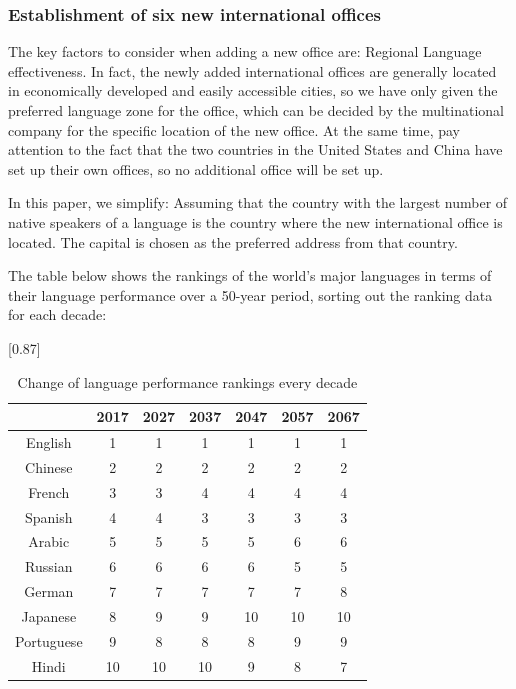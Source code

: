 \subsubsection{Establishment of six new international offices} 
\noindent The key factors to consider when adding a new office are: Regional Language effectiveness. In fact, the newly added international offices are generally located in economically developed and easily accessible cities, so we have only given the preferred language zone for the office, which can be decided by the multinational company for the specific location of the new office. At the same time, pay attention to the fact that the two countries in the United States and China have set up their own offices, so no additional office will be set up.
\par In this paper, we simplify: Assuming that the country with the largest number of native speakers of a language is the country where the new international office is located. The capital is chosen as the preferred address from that country.
\par The table below shows the rankings of the world's major languages in terms of their language performance over a 50-year period, sorting out the ranking data for each decade:

\begin{table}[H]
	\centering
	\caption{Change of language performance rankings every decade}
		 \scalebox{0.87}[0.87]{%
	\begin{tabular*}{40em}{@{\extracolsep{\fill}}ccccccc}
		\toprule
		\multicolumn{1}{r}{\backslashbox[0pt][l]{Language}{Year}} & 2017  & 2027  & 2037  & 2047  & 2057  & 2067 \\
		\midrule
		English & 1     & 1     & 1     & 1     & 1     & 1 \\
		\midrule
		Chinese & 2     & 2     & 2     & 2     & 2     & 2 \\
		\midrule
		French & 3     & 3     & 4     & 4     & 4     & 4 \\
		\midrule
		Spanish & 4     & 4     & 3     & 3     & 3     & 3 \\
		\midrule
		Arabic & 5     & 5     & 5     & 5     & 6     & 6 \\
		\midrule
		Russian & 6     & 6     & 6     & 6     & 5     & 5 \\
		\midrule
		German & 7     & 7     & 7     & 7     & 7     & 8 \\
		\midrule
		Japanese & 8     & 9     & 9     & 10    & 10    & 10 \\
		\midrule
		Portuguese & 9     & 8     & 8     & 8     & 9     & 9 \\
		\midrule
		Hindi & 10    & 10    & 10    & 9     & 8     & 7 \\
		\bottomrule
	\end{tabular*}%
}
	\label{tab:Change}%
\end{table}%

